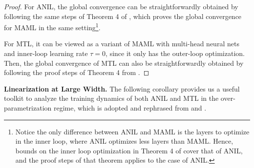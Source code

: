 \documentclass{article}
\begin{document}
\begin{proof}
For ANIL, the global convergence can be straightforwardly obtained by following the same steps of Theorem 4 of \citet{meta-ntk}, which proves the global convergence for MAML in the same setting\footnote{Notice the only difference between ANIL and MAML is the layers to optimize in the inner loop, where ANIL optimizes less layers than MAML. Hence, bounds on the inner loop optimization in Theorem 4 of \citet{meta-ntk} cover that of ANIL, and the proof steps of that theorem applies to the case of ANIL.}. 

For MTL, it can be viewed as a variant of MAML with multi-head neural nets and inner-loop learning rate $\tau = 0$, since it only has the outer-loop optimization. Then, the global convergence of MTL can also be straightforwardly obtained by following the proof steps of Theorem 4 from \citet{meta-ntk}.
\end{proof}


\textbf{Linearization at Large Width.} The following corollary provides us a useful toolkit to analyze the training dynamics of both ANIL and MTL in the over-parametrization regime, which is adopted and rephrased from \citet{meta-ntk} and \citet{lee2019wide}.
\end{document}
